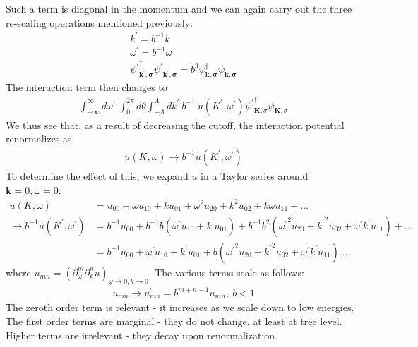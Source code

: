 \documentclass[12pt]{article}
\begin{document}
Such a term is diagonal in the momentum and we can again carry out the three re-scaling operations mentioned previously:
\begin{gather}
	k^\prime = b^{-1} k\\
	\omega^\prime = b^{-1} \omega\\
{\psi^\prime}^\dagger_\mathbf{k^\prime,\sigma}{\psi^\prime}_\mathbf{k^\prime,\sigma} = b^{3}\psi^\dagger_\mathbf{k,\sigma}\psi_\mathbf{k,\sigma}
\end{gather}
The interaction term then changes to
\begin{equation}\begin{aligned}
	\int_{-\infty}^\infty d\omega^\prime\;\int_0^{2\pi} d\theta \int_{-\Lambda}^{\Lambda}dk^\prime ~ b^{-1} ~ u(K^\prime,\omega^\prime){\psi^\prime}_{\mathbf{K},\sigma}^\dagger\psi_{\mathbf{K},\sigma}
\end{aligned}\end{equation}
We thus see that, as a result of decreasing the cutoff, the interaction potential renormalizes as
\begin{equation}\begin{aligned}
	u(K,\omega) \to b^{-1} u(K^\prime,\omega^\prime)
\end{aligned}\end{equation}
To determine the effect of this, we expand \(u\) in a Taylor series around \(\mathbf{k}=0,\omega=0\):
\begin{equation}\begin{aligned}
	u(K,\omega) &= u_{00} + \omega u_{10} + k u_{01} + \omega^2 u_{20} + k^2 u_{02} + k\omega u_{11} + ...\\
	\to b^{-1}u(K^\prime,\omega^\prime) &= b^{-1}u_{00} + b^{-1} b\left(\omega^\prime u_{10} + k^\prime u_{01}\right) + b^{-1} b^{2} \left({\omega^\prime}^2 u_{20} + {k^\prime}^2 u_{02} + \omega^\prime k^\prime u_{11}\right) + ...\\
						   &= b^{-1}u_{00} + \omega^\prime u_{10} + k^\prime u_{01} + b \left({\omega^\prime}^2 u_{20} + {k^\prime}^2 u_{02} + \omega^\prime k^\prime u_{11}\right)...
\end{aligned}\end{equation}
where \(u_{mn} = \left(\partial^m_\omega \partial^n_k u\right)_{\omega \to 0, k \to 0}\). The various terms scale as follows:
\begin{equation}\begin{aligned}
	u_{mn} \to u_{mn}^\prime = b^{m + n - 1}u_{mn}, ~b<1
\end{aligned}\end{equation}
The zeroth order term is relevant - it increases as we scale down to low energies. The first order terms are marginal - they do not change, at least at tree level. Higher terms are irrelevant - they decay upon renormalization.
\end{document}
